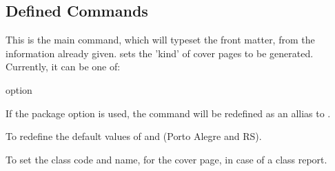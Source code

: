 \documentclass[article,nogeometry,english,tocdepth=3,secdepth=3]{ufrgscca} %
\begin{document}
\subsection{Defined Commands}
\begin{codedescribe}[code,new=2023/11/18]{\MakeCoverPages}
	\begin{codesyntax}%
	\end{codesyntax}
This is the main command, which will typeset the front matter, from the information already given.  sets the 'kind' of cover pages to be generated. Currently, it can be one of:
\end{codedescribe}
\begin{describelist}{option}
\end{describelist}
\begin{tsremark}[N.B.:]
 If the package option  is used, the command \tsobj{\maketitle} will be redefined as an allias to \tsobj{\MakeCoverPages}.
\end{tsremark}


\begin{codedescribe}{\location}
	\begin{codesyntax}%
		\tsmacro{\location}{city,state}
	\end{codesyntax}
	To redefine the default values of  and  (Porto Alegre and RS).\\
\end{codedescribe}

\begin{codedescribe}[code,new=2023/11/18]{\class}
	\begin{codesyntax}%
		\tsmacro{\class}{code,name}
	\end{codesyntax}
	To set the class code and name, for the cover page, in case of a class report.
\end{codedescribe}
\end{document}
